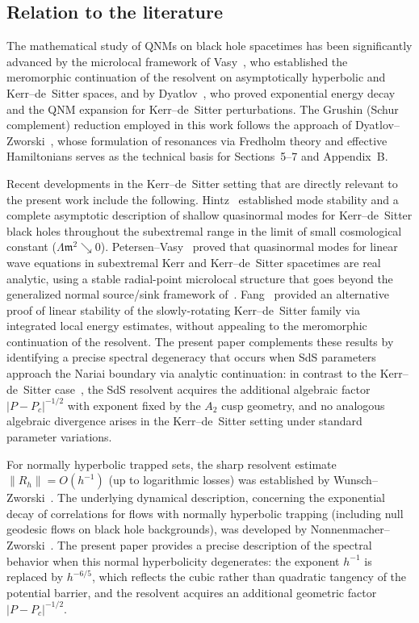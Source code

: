 \documentclass[12pt,a4paper]{amsart}
\theoremstyle{remark}
\begin{document}
\subsection*{Relation to the literature}

The mathematical study of QNMs on black hole spacetimes has been significantly advanced
by the microlocal framework of Vasy~\cite{Vasy2013}, who established the meromorphic
continuation of the resolvent on asymptotically hyperbolic and Kerr--de~Sitter
spaces, and by Dyatlov~\cite{Dyatlov11}, who proved exponential energy decay
and the QNM expansion for Kerr--de~Sitter perturbations. The Grushin (Schur complement)
reduction employed in this work follows the approach of Dyatlov--Zworski~\cite{DZ19}, whose
formulation of resonances via Fredholm theory and effective Hamiltonians serves as the
technical basis for Sections~5--7 and Appendix~B.

Recent developments in the Kerr--de~Sitter setting that are directly relevant to the
present work include the following.
Hintz~\cite{Hintz2022} established mode stability and a complete asymptotic description
of shallow quasinormal modes for Kerr--de~Sitter black holes throughout the subextremal
range in the limit of small cosmological constant ($\Lambda\mathfrak{m}^2 \searrow 0$).
Petersen--Vasy~\cite{PetersenVasy2023} proved that quasinormal modes for linear wave
equations in subextremal Kerr and Kerr--de~Sitter spacetimes are real analytic,
using a stable radial-point microlocal structure that goes beyond the generalized
normal source/sink framework of~\cite{Vasy2013}.
Fang~\cite{Fang2022} provided an alternative proof of linear stability of the
slowly-rotating Kerr--de~Sitter family via integrated local energy estimates, without
appealing to the meromorphic continuation of the resolvent.
The present paper complements these results by identifying a precise spectral degeneracy
that occurs when SdS parameters approach the Nariai boundary via analytic continuation:
in contrast to the Kerr--de~Sitter case~\cite{Dyatlov11,Dyatlov12}, the SdS resolvent
acquires the additional algebraic factor $|P-P_c|^{-1/2}$ with exponent fixed by the
$A_2$ cusp geometry, and no analogous algebraic divergence arises in the Kerr--de~Sitter
setting under standard parameter variations.

For normally hyperbolic trapped sets, the sharp resolvent estimate $\|R_h\| = O(h^{-1})$
(up to logarithmic losses) was established by Wunsch--Zworski~\cite{WZ11}.
The underlying dynamical description, concerning the exponential decay of correlations for flows with normally
hyperbolic trapping (including null geodesic flows on black hole backgrounds), was
developed by Nonnenmacher--Zworski~\cite{NZ15}.
The present paper provides a precise description of the spectral behavior when this
normal hyperbolicity degenerates: the exponent $h^{-1}$ is replaced by $h^{-6/5}$,
which reflects the cubic rather than quadratic tangency of the potential barrier, and the
resolvent acquires an additional geometric factor $|P-P_c|^{-1/2}$.
\end{document}

